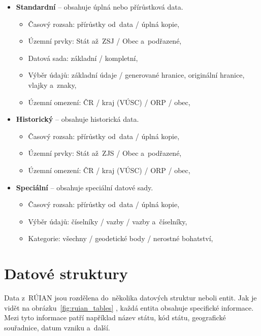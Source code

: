 \begin{itemize}
    \item \textbf{Standardní} -- obsahuje úplná nebo přírůstková data.
    \begin{itemize}[itemsep=0pt]
        \item Časový rozsah: přírůstky od~data / úplná kopie,
        \item Územní prvky: Stát až~ZSJ / Obec a~podřazené,
        \item Datová sada: základní / kompletní,
        \item Výběr údajů: základní údaje / generované hranice, originální hranice, vlajky a~znaky,
        \item Územní omezení: ČR / kraj (VÚSC) / ORP / obec,
    \end{itemize}

    \item \textbf{Historický} -- obsahuje historická data.
    \begin{itemize}[itemsep=0pt]
        \item Časový rozsah: přírůstky od~data / úplná kopie,
        \item Územní prvky: Stát až~ZJS / Obec a~podřazené,
        \item Územní omezení: ČR / kraj (VÚSC) / ORP / obec,
    \end{itemize}

    \item \textbf{Speciální} -- obsahuje speciální datové sady.
    \begin{itemize}[itemsep=0pt]
        \item Časový rozsah: přírůstky od~data / úplná kopie,
        \item Výběr údajů: číselníky / vazby / vazby a~číselníky,
        \item Kategorie: všechny / geodetické body / nerostné bohatství,
    \end{itemize}
\end{itemize}

\section{Datové struktury}
Data z~RÚIAN jsou rozdělena do~několika datových struktur neboli entit. 
Jak je vidět na obrázku~\ref{fig:ruian_tables} \cite{ruian_vfr}, každá entita obsahuje specifické informace. 
Mezi tyto informace patří například název státu, kód státu, geografické souřadnice, datum vzniku a~další. 

